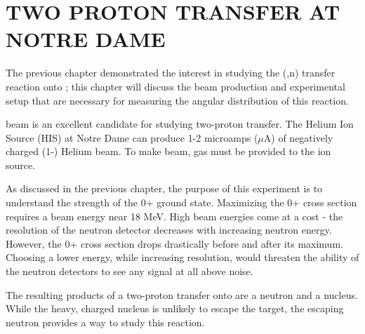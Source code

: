 %
%
%
%
%
%
%
%

%
%

\chapter{TWO PROTON TRANSFER AT NOTRE DAME}
\label{chap:2pExpt}

The previous chapter demonstrated the interest in studying the (,n) transfer reaction onto \GeTargets ; this chapter will discuss the beam production and experimental setup that are necessary for measuring the angular distribution of this reaction.

 beam is an excellent candidate for studying two-proton transfer.  The Helium Ion Source (HIS) at Notre Dame can produce 1-2 microamps ($\mu$A) of negatively charged (1-) Helium beam.  To make  beam,  gas must be provided to the ion source.  

As discussed in the previous chapter, the purpose of this experiment is to understand the strength of the 0+ ground state.  Maximizing the 0+ cross section requires a beam energy near 18 MeV.  High beam energies come at a cost - the resolution of the neutron detector decreases with increasing neutron energy.  However, the 0+ cross section drops drastically before and after its maximum.  Choosing a lower energy, while increasing resolution, would threaten the ability of the neutron detectors to see any signal at all above noise.

The resulting products of a two-proton transfer onto  are a neutron and a  nucleus.  While the heavy, charged  nucleus is unlikely to escape the target, the escaping neutron provides a way to study this reaction.

